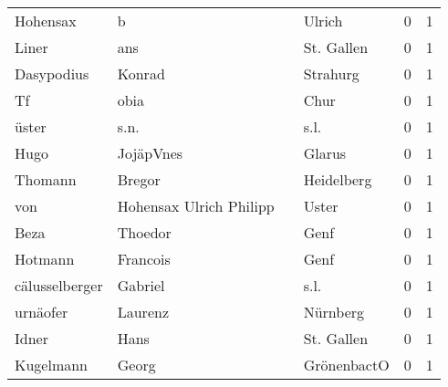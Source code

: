 \begin{tabular}{llllrr}
                 Hohensax &                                  b &             &                                      Ulrich &          0 &         1 \\
                    Liner &                                ans &             &                                  St. Gallen &          0 &         1 \\
               Dasypodius &                             Konrad &             &                                    Strahurg &          0 &         1 \\
                       Tf &                               obia &             &                                        Chur &          0 &         1 \\
                    üster &                               s.n. &             &                                        s.l. &          0 &         1 \\
                     Hugo &                          JojäpVnes &             &                                      Glarus &          0 &         1 \\
                  Thomann &                             Bregor &             &                                  Heidelberg &          0 &         1 \\
                      von &            Hohensax Ulrich Philipp &             &                                       Uster &          0 &         1 \\
                     Beza &                            Thoedor &             &                                        Genf &          0 &         1 \\
                  Hotmann &                           Francois &             &                                        Genf &          0 &         1 \\
           cälusselberger &                            Gabriel &             &                                        s.l. &          0 &         1 \\
                 urnäofer &                            Laurenz &             &                                    Nürnberg &          0 &         1 \\
                    Idner &                               Hans &             &                                  St. Gallen &          0 &         1 \\
                Kugelmann &                              Georg &             &                                 GrönenbactO &          0 &         1 \\

\end{tabular}
